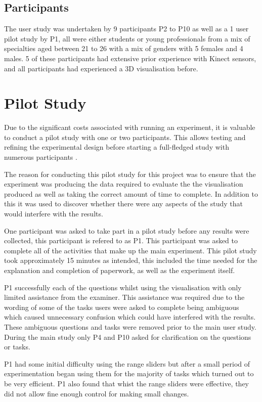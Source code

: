 \subsection{Participants}
The user study was undertaken by 9 participants P2 to P10 as well as a 1 user pilot study by P1, all were either students or
young professionals from a mix of specialties aged between 21 to 26 with a mix
of genders with 5 females and 4 males. 5 of these participants had extensive prior experience with Kinect sensors, and all participants had experienced a 3D visualisation before.

\section{Pilot Study}
Due to the significant costs associated with running an experiment, it 
is valuable to conduct a pilot study with one or two 
participants. This allows testing and refining the experimental
design before starting a full-fledged study with numerous 
participants \cite{kosara2003thoughts}. 

The reason for conducting this pilot study for this project was to ensure that the experiment was
producing the data required to evaluate the the visualisation produced as well
as taking the correct amount of time to complete. In addition to this it was
used to discover whether there were any aspects of the study that would
interfere with the results.

One participant was asked to take part in a pilot study before any results were
collected, this participant is refered to as P1. This participant was asked to complete all of the activities that
make up the main experiment. This pilot study took approximately 15 minutes as
intended, this included the time needed for the explanation and completion of
paperwork, as well as the experiment itself.

P1 successfully each of the questions whilst using the visualisation with only limited assistance from the examiner. This assistance was required due to the wording of
some of the tasks users were asked to complete being ambiguous which caused
unnecessary confusion which could have interfered with the results. These ambiguous questions and
tasks were removed prior to the main user study. During the main study only P4 and P10 asked for clarification on the questions or tasks.

P1 had some initial difficulty using the range sliders but after a small period of experimentation began using them for the majority of tasks which turned out to be very efficient. P1 also found that whist the range sliders were effective, they did not allow fine enough control for making small changes.

